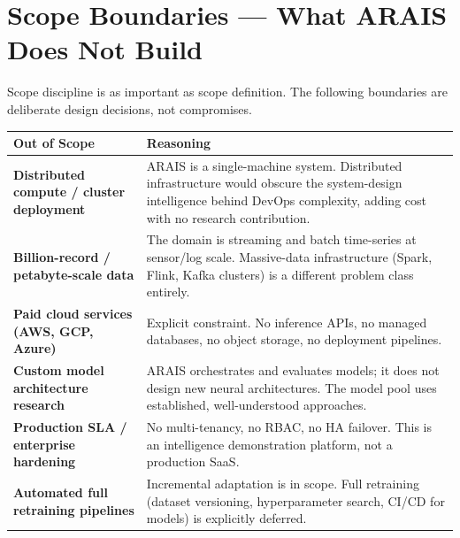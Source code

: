 \documentclass[11pt, a4paper]{article}
\begin{document}
\section{Scope Boundaries — What ARAIS Does Not Build}

Scope discipline is as important as scope definition.
The following boundaries are deliberate design decisions, not compromises.

\vspace{6pt}
\begin{tabularx}{\linewidth}{>{\bfseries\color{accent}}p{4.8cm} X}
\toprule
\rowcolor{accent!8}
\color{primary}Out of Scope & \color{primary}Reasoning\\
\midrule
Distributed compute / cluster deployment & ARAIS is a single-machine system.
  Distributed infrastructure would obscure the system-design intelligence behind
  DevOps complexity, adding cost with no research contribution.\\
\addlinespace[3pt]
Billion-record / petabyte-scale data & The domain is streaming and batch time-series
  at sensor/log scale. Massive-data infrastructure (Spark, Flink, Kafka clusters)
  is a different problem class entirely.\\
\addlinespace[3pt]
Paid cloud services (AWS, GCP, Azure) & Explicit constraint. No inference APIs,
  no managed databases, no object storage, no deployment pipelines.\\
\addlinespace[3pt]
Custom model architecture research & ARAIS orchestrates and evaluates models;
  it does not design new neural architectures. The model pool uses
  established, well-understood approaches.\\
\addlinespace[3pt]
Production SLA / enterprise hardening & No multi-tenancy, no RBAC, no HA failover.
  This is an intelligence demonstration platform, not a production SaaS.\\
\addlinespace[3pt]
Automated full retraining pipelines & Incremental adaptation is in scope.
  Full retraining (dataset versioning, hyperparameter search, CI/CD for models)
  is explicitly deferred.\\
\bottomrule
\end{tabularx}
\end{document}

